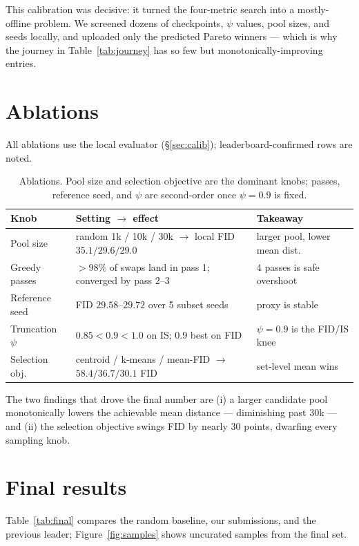\documentclass{article}
\begin{document}
This calibration was decisive: it turned the four-metric search into a
mostly-offline problem. We screened dozens of checkpoints, $\psi$ values, pool
sizes, and seeds locally, and uploaded only the predicted Pareto winners ---
which is why the journey in Table~\ref{tab:journey} has so few but
monotonically-improving entries.

\section{Ablations}
\label{sec:ablations}
All ablations use the local evaluator (\S\ref{sec:calib}); leaderboard-confirmed
rows are noted.

\begin{table}[h]\centering\small
\begin{tabular}{l l l}
\toprule
Knob & Setting $\rightarrow$ effect & Takeaway \\
\midrule
Pool size      & random 1k / 10k / 30k $\rightarrow$ local FID $35.1/29.6/29.0$ & larger pool, lower mean dist. \\
Greedy passes  & $>\!98\%$ of swaps land in pass 1; converged by pass 2--3 & 4 passes is safe overshoot \\
Reference seed & FID $29.58$--$29.72$ over 5 subset seeds & proxy is stable \\
Truncation $\psi$ & $0.85\!<\!0.9\!<\!1.0$ on IS; $0.9$ best on FID & $\psi{=}0.9$ is the FID/IS knee \\
Selection obj. & centroid / k-means / mean-FID $\rightarrow$ $58.4/36.7/30.1$ FID & set-level mean wins \\
\bottomrule
\end{tabular}
\caption{Ablations. Pool size and selection objective are the dominant knobs;
passes, reference seed, and $\psi$ are second-order once $\psi{=}0.9$ is fixed.}
\label{tab:ablations}
\end{table}

The two findings that drove the final number are (i) a larger candidate pool
monotonically lowers the achievable mean distance --- diminishing past $30$k ---
and (ii) the selection objective swings FID by nearly $30$ points, dwarfing every
sampling knob.

\section{Final results}
\label{sec:results}
Table~\ref{tab:final} compares the random baseline, our submissions, and the
previous leader; Figure~\ref{fig:samples} shows uncurated samples from the final
set.
\end{document}
